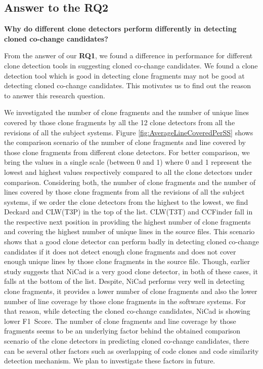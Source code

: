 \documentclass[review]{elsarticle}
\begin{document}
\subsection{Answer to the \textbf{RQ2}}
\textbf{Why do different clone detectors perform differently in detecting cloned co-change candidates?} 

From the answer of our \textbf{RQ1}, we found a difference in performance for different clone detection tools in suggesting cloned co-change candidates. We found a clone detection tool which is good in detecting clone fragments may not be good at detecting cloned co-change candidates. This motivates us to find out the reason to answer this research question. 

We investigated the number of clone fragments and the number of unique lines covered by those clone fragments by all the 12 clone detectors from all the revisions of all the subject systems. Figure \ref{fig:AverageLineCoveredPerSS}  shows the comparison scenario of the number of clone fragments and line covered by those clone fragments from different clone detectors. For better comparison, we bring the values in a single scale (between 0 and 1) where 0 and 1 represent the lowest and highest values respectively compared to all the clone detectors under comparison. Considering both, the number of clone fragments and the number of lines covered by those clone fragments from all the revisions of all the subject systems, if we order the clone detectors from the highest to the lowest, we find Deckard and CLW(T3P) in the top of the list. CLW(T3T) and CCFinder fall in the respective next position in providing the highest number of clone fragments and covering the highest number of unique lines in the source files. This scenario shows that a good clone detector can perform badly in detecting cloned co-change candidates if it does not detect enough clone fragments and does not cover enough unique lines by those clone fragments in the source file. Though, earlier study \cite{Mondal-2014-PRC-2597073-2597104rankingCoChange} suggests that NiCad is a very good clone detector, in both of these cases, it falls at the bottom of the list. Despite, NiCad performs very well in detecting clone fragments, it provides a lower number of clone fragments and also the lower number of line coverage by those clone fragments in the software systems. For that reason, while detecting the cloned co-change candidates, NiCad is showing lower F1~Score. The number of clone fragments and line coverage by those fragments seems to be an underlying factor behind the obtained comparison scenario of the clone detectors in predicting cloned co-change candidates, there can be several other factors such as overlapping of code clones and code similarity detection mechanism. We plan to investigate these factors in future.
\end{document}
